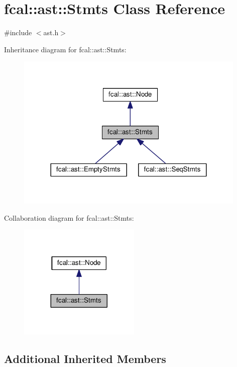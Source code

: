 \hypertarget{classfcal_1_1ast_1_1Stmts}{}\section{fcal\+:\+:ast\+:\+:Stmts Class Reference}
\label{classfcal_1_1ast_1_1Stmts}


{\ttfamily \#include $<$ast.\+h$>$}



Inheritance diagram for fcal\+:\+:ast\+:\+:Stmts\+:\nopagebreak
\begin{figure}[H]
\begin{center}
\leavevmode
\includegraphics[width=312pt]{classfcal_1_1ast_1_1Stmts__inherit__graph}
\end{center}
\end{figure}


Collaboration diagram for fcal\+:\+:ast\+:\+:Stmts\+:\nopagebreak
\begin{figure}[H]
\begin{center}
\leavevmode
\includegraphics[width=164pt]{classfcal_1_1ast_1_1Stmts__coll__graph}
\end{center}
\end{figure}
\subsection*{Additional Inherited Members}


